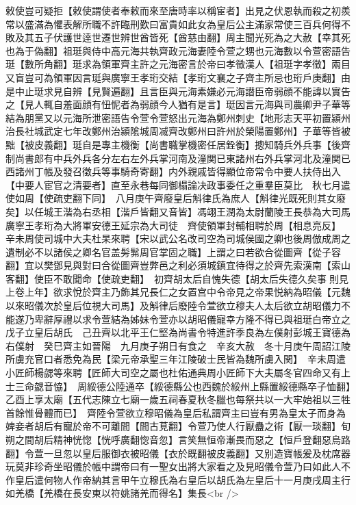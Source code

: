 敕使豈可疑拒【敕使謂使者奉敕而來至唐時率以稱宦者】出見之伏恩執而殺之初羨常以盛滿為懼表解所職不許臨刑歎曰富貴如此女為皇后公主滿家常使三百兵何得不敗及其五子伏護世逹世遷世辨世酋皆死【酋慈由翻】周主聞光死為之大赦【幸其死也為于偽翻】祖珽與侍中高元海共執齊政元海妻陸令萱之甥也元海數以令萱密語告珽【數所角翻】珽求為領軍齊主許之元海密言於帝曰孝徵漢人【祖珽字孝徵】兩目又盲豈可為領軍因言珽與廣寧王孝珩交結【孝珩文襄之子齊主所忌也珩戶庚翻】由是中止珽求見自辨【見賢遍翻】且言臣與元海素嫌必元海譛臣帝弱顔不能諱以實告之【見人輒自羞面顔有忸怩者為弱顔今人猶有是言】珽因言元海與司農卿尹子華等結為朋黨又以元海所泄密語告令萱令萱怒出元海為鄭州刺史【地形志天平初置潁州治長社城武定七年改鄭州治潁隂城周㓕齊改鄭州曰許州於榮陽置鄭州】子華等皆被黜【被皮義翻】珽自是專主機衡【尚書職掌機密任居銓衡】摠知騎兵外兵事【後齊制尚書郎有中兵外兵各分左右左外兵掌河南及潼関已東諸州右外兵掌河北及潼関已西諸州丁帳及發召徵兵等事騎奇寄翻】内外親戚皆得顯位帝常令中要人扶侍出入【中要人宦官之清要者】直至永巷每同御榻論决政事委任之重羣臣莫比　秋七月遣使如周【使疏吏翻下同】　八月庚午齊廢皇后斛律氏為庶人【斛律光既死則其女廢矣】以任城王湝為右丞相【湝戶皆翻又音皆】馮翊王潤為太尉蘭陵王長恭為大司馬廣寧王孝珩為大將軍安德王延宗為大司徒　齊使領軍封輔相聘於周【相息亮反】　辛未周使司城中大夫杜杲來聘【宋以武公名改司空為司城侯國之卿也後周倣成周之遺制必不以諸侯之卿名官盖髣髴周官掌固之職】上謂之曰若欲合從圖齊【從子容翻】宜以樊鄧見與對曰合從圖齊豈弊邑之利必須城鎮宜待得之於齊先索漢南【索山客翻】使臣不敢聞命【使疏吏翻】　初齊胡太后自愧失德【胡太后失德久矣事則見上卷上年】欲求悅於齊主乃飾其兄長仁之女置宫中令帝見之帝果悦納為昭儀【元魏以來昭儀次於皇后位視大司馬】及斛律后廢陸令萱欲立穆夫人太后欲立胡昭儀力不能遂乃卑辭厚禮以求令萱結為姊妹令萱亦以胡昭儀寵幸方隆不得已與祖珽白帝立之戊子立皇后胡氏　己丑齊以北平王仁堅為尚書令特進許季良為左僕射彭城王寶德為右僕射　癸巳齊主如晉陽　九月庚子朔日有食之　辛亥大赦　冬十月庚午周詔江陵所虜充官口者悉免為民【梁元帝承聖三年江陵破士民皆為魏所虜入関】　辛未周遣小匠師楊勰等來聘【匠師大司空之屬也杜佑通典周小匠師下大夫屬冬官四命又有上士三命勰音恊】　周綏德公陸通卒【綏德縣公也西魏於綏州上縣置綏德縣卒子恤翻】　乙酉上享太廟【五代志陳立七廟一歲五祠春夏秋冬臘也每祭共以一大牢始祖以三牲首餘惟骨體而已】　齊陸令萱欲立穆昭儀為皇后私謂齊主曰豈有男為皇太子而身為婢妾者胡后有寵於帝不可離間【間古莧翻】令萱乃使人行厭蠱之術【厭一琰翻】旬朔之間胡后精神恍惚【恍呼廣翻惚音忽】言笑無恒帝漸畏而惡之【恒戶登翻惡烏路翻】令萱一旦忽以皇后服御衣被昭儀【衣於既翻被皮義翻】又别造寶帳爰及枕席器玩莫非珍奇坐昭儀於帳中謂帝曰有一聖女出將大家看之及見昭儀令萱乃曰如此人不作皇后遣何物人作帝納其言甲午立穆氏為右皇后以胡氏為左皇后十一月庚戌周主行如羌橋【羌橋在長安東以符姚諸羌而得名】集長<br />
